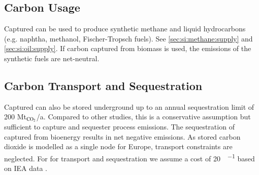 \subsection{Carbon Usage}

Captured \co can be used to produce synthetic methane and liquid hydrocarbons
(e.g. naphtha, methanol, Fischer-Tropsch fuels). See
\cref{sec:si:methane:supply} and \cref{sec:si:oil:supply}. If carbon captured
from biomass is used, the \co emissions of the synthetic fuels are net-neutral.

\subsection{Carbon Transport and Sequestration}

Captured \co can also be stored underground up to an annual sequestration limit
of 200 Mt$_{\ce{CO2}}$/a. Compared to other studies, this is a conservative assumption but
sufficient to capture and sequester process emissions. The sequestration of
captured \co from bioenergy results in net negative emissions. As stored carbon
dioxide is modelled as a single node for Europe, transport constraints are
neglected. For for \co transport and sequestration we assume a cost of
\SI{20}{\sieuro\per\tco} based on IEA data .
